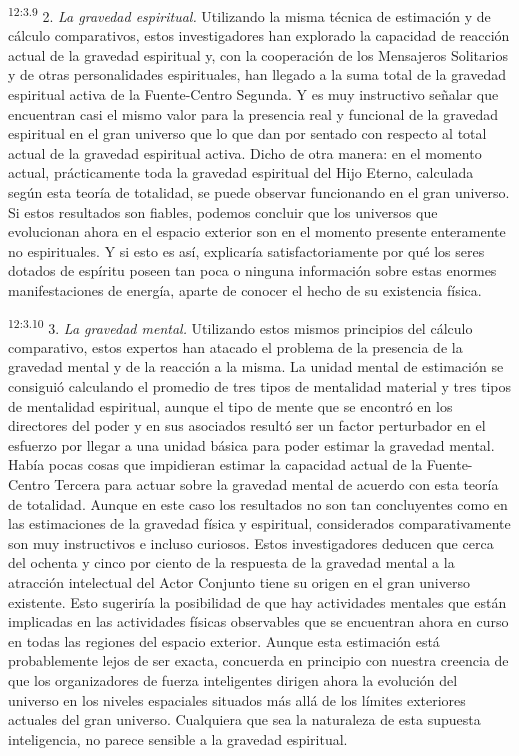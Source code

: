 \par
\textsuperscript{12:3.9} 2. \textit{La gravedad espiritual.} Utilizando la misma técnica de estimación y de cálculo comparativos, estos investigadores han explorado la capacidad de reacción actual de la gravedad espiritual y, con la cooperación de los Mensajeros Solitarios y de otras personalidades espirituales, han llegado a la suma total de la gravedad espiritual activa de la Fuente-Centro Segunda. Y es muy instructivo señalar que encuentran casi el mismo valor para la presencia real y funcional de la gravedad espiritual en el gran universo que lo que dan por sentado con respecto al total actual de la gravedad espiritual activa. Dicho de otra manera: en el momento actual, prácticamente toda la gravedad espiritual del Hijo Eterno, calculada según esta teoría de totalidad, se puede observar funcionando en el gran universo. Si estos resultados son fiables, podemos concluir que los universos que evolucionan ahora en el espacio exterior son en el momento presente enteramente no espirituales. Y si esto es así, explicaría satisfactoriamente por qué los seres dotados de espíritu poseen tan poca o ninguna información sobre estas enormes manifestaciones de energía, aparte de conocer el hecho de su existencia física.

\par
\textsuperscript{12:3.10} 3. \textit{La gravedad mental.} Utilizando estos mismos principios del cálculo comparativo, estos expertos han atacado el problema de la presencia de la gravedad mental y de la reacción a la misma. La unidad mental de estimación se consiguió calculando el promedio de tres tipos de mentalidad material y tres tipos de mentalidad espiritual, aunque el tipo de mente que se encontró en los directores del poder y en sus asociados resultó ser un factor perturbador en el esfuerzo por llegar a una unidad básica para poder estimar la gravedad mental. Había pocas cosas que impidieran estimar la capacidad actual de la Fuente-Centro Tercera para actuar sobre la gravedad mental de acuerdo con esta teoría de totalidad. Aunque en este caso los resultados no son tan concluyentes como en las estimaciones de la gravedad física y espiritual, considerados comparativamente son muy instructivos e incluso curiosos. Estos investigadores deducen que cerca del ochenta y cinco por ciento de la respuesta de la gravedad mental a la atracción intelectual del Actor Conjunto tiene su origen en el gran universo existente. Esto sugeriría la posibilidad de que hay actividades mentales que están implicadas en las actividades físicas observables que se encuentran ahora en curso en todas las regiones del espacio exterior. Aunque esta estimación está probablemente lejos de ser exacta, concuerda en principio con nuestra creencia de que los organizadores de fuerza inteligentes dirigen ahora la evolución del universo en los niveles espaciales situados más allá de los límites exteriores actuales del gran universo. Cualquiera que sea la naturaleza de esta supuesta inteligencia, no parece sensible a la gravedad espiritual.

